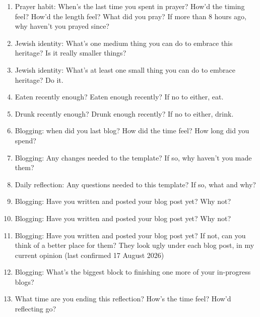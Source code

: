 \begin{enumerate}
\item Prayer habit: When's the last time you spent in prayer? How'd the timing feel? How'd the length feel? What did you pray? If more than 8 hours ago, why haven't you prayed since?

\item Jewish identity: What's one medium thing you can do to embrace this heritage? Is it really smaller things?

\item Jewish identity: What's at least one small thing you can do to embrace heritage? Do it.

\item Eaten recently enough? Eaten enough recently? If no to either, eat.

\item Drunk recently enough? Drunk enough recently? If no to either, drink.

\item Blogging: when did you last blog? How did the time feel? How long did you spend?

\item Blogging: Any changes needed to the template? If so, why haven't you made them?

\item Daily reflection: Any questions needed to this template? If so, what and why?

\item Blogging: Have you written and posted your  blog post yet? Why not?

\item Blogging: Have you written and posted your  blog post yet? Why not?

\item Blogging: Have you written and posted your  blog post yet? If not, can you think of a better place for them? They look ugly under each blog post, in my current opinion (last confirmed 17 August 2026)

\item Blogging: What's the biggest block to finishing one more of your in-progress blogs?

\item What time are you ending this reflection? How's the time feel? How'd reflecting go?

\end{enumerate}